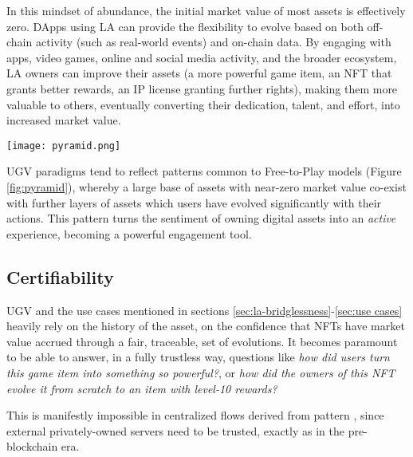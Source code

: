 In this mindset of abundance, the initial market value of most assets is effectively zero.
DApps using LA can provide the flexibility to evolve based on both
off-chain activity (such as real-world events) and on-chain data.
By engaging with apps, video games,
online and social media activity, and the broader ecosystem,
LA owners can improve their assets (a more powerful game item,
an NFT that grants better rewards, an IP license granting further rights),
making them more valuable to others,
eventually converting their dedication, talent, and effort,
into increased market value.

\begin{Figure}
    \medskip
    \texttt{[image: pyramid.png]}
    \medskip
    \label{fig:pyramid}
\end{Figure}

UGV paradigms tend to reflect patterns common to Free-to-Play models
(Figure \ref{fig:pyramid}), whereby
a large base of assets with near-zero market value co-exist with further layers
of assets which users have evolved significantly with their actions. This pattern turns the 
sentiment of owning digital assets into an {\it active} experience, 
becoming a powerful engagement tool.


\subsection{Certifiability}\label{sec:ugv-certifiable}

UGV and the use cases mentioned in sections \ref{sec:la-bridglessness}-\ref{sec:use cases}
heavily rely on the history of the asset, on the confidence that NFTs have
market value accrued through a fair, traceable, set of evolutions.
It becomes paramount to be able to answer, in a fully trustless way, 
questions like {\it how did users turn this game item into something so powerful?}, or {\it how did
the owners of this NFT evolve it from scratch to an item with level-10 rewards?}

This is manifestly impossible in centralized flows derived from 
pattern , since external privately-owned servers need 
to be trusted, exactly as in the pre-blockchain era.


